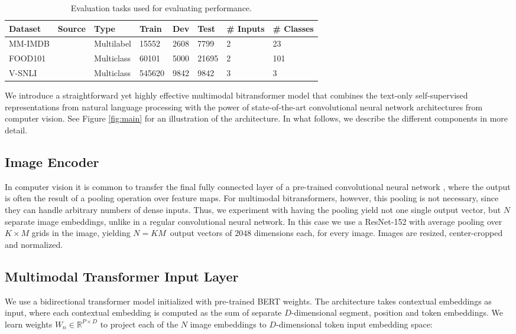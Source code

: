 \documentclass[11pt,a4paper]{article}
\begin{document}
\begin{table*}[t]
    \centering\small
    \begin{tabular}{llllllll}
        \toprule
        \textbf{Dataset} & \textbf{Source} & \textbf{Type} & \textbf{Train} & \textbf{Dev} & \textbf{Test} & \textbf{\# Inputs} & \textbf{\# Classes}\\
        \midrule
        MM-IMDB & \cite{Arevalo:2017mmimdb} & Multilabel & 15552 & 2608 & 7799 & 2 & 23\\
        FOOD101 & \cite{Wang:2015food101} & Multiclass & 60101 & 5000 & 21695 & 2 & 101\\
V-SNLI & \cite{Vu:2018vsnli} & Multiclass & 545620 & 9842 & 9842 & 3 & 3\\
\bottomrule
    \end{tabular}
    \caption{Evaluation tasks used for evaluating performance.}
    \label{tab:dataset_stats}
\end{table*}

We introduce a straightforward yet highly effective multimodal bitransformer model that combines the text-only self-supervised representations from natural language processing with the power of state-of-the-art convolutional neural network architectures from computer vision. See Figure \ref{fig:main} for an illustration of the architecture. In what follows, we describe the different components in more detail.

\subsection{Image Encoder} In computer vision it is common to transfer the final fully connected layer of a pre-trained convolutional neural network \cite{Razavian:2014cvpr}, where the output is often the result of a pooling operation over feature maps. For multimodal bitransformers, however, this pooling is not necessary, since they can handle arbitrary numbers of dense inputs. Thus, we experiment with having the pooling yield not one single output vector, but $N$ separate image embeddings, unlike in a regular convolutional neural network. In this case we use a ResNet-152 \cite{He:2016cvpr} with average pooling over $K\times M$ grids in the image, yielding $N=KM$~output vectors of $2048$ dimensions each, for every image. Images are resized, center-cropped and normalized.

\subsection{Multimodal Transformer Input Layer} We use a bidirectional transformer model initialized with pre-trained BERT weights. The architecture takes contextual embeddings as input, where each contextual embedding is computed as the sum of separate $D$-dimensional segment, position and token embeddings. We learn weights $W_n \in \mathbb{R}^{P \times D}$ to project each of the $N$ image embeddings to $D$-dimensional token input embedding space:
\end{document}
